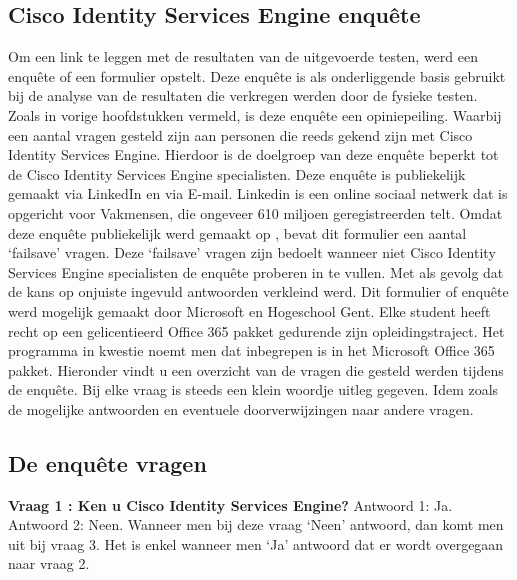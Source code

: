 \begin{itemize}
\section{Cisco Identity Services Engine enquête}
Om een link te leggen met de resultaten van de uitgevoerde testen, werd een enquête of een formulier opstelt. Deze enquête is als onderliggende basis gebruikt bij de analyse van de resultaten die verkregen werden door de fysieke testen. Zoals in vorige hoofdstukken vermeld, is deze enquête een opiniepeiling. Waarbij een aantal vragen gesteld zijn aan personen die reeds gekend zijn met Cisco Identity Services Engine. Hierdoor is de doelgroep van deze enquête beperkt tot de Cisco Identity Services Engine specialisten.
\newline
\newline
Deze enquête is publiekelijk gemaakt via LinkedIn en via E-mail. Linkedin is een online sociaal netwerk dat is opgericht voor Vakmensen, die ongeveer 610 miljoen geregistreerden telt. Omdat deze enquête publiekelijk werd gemaakt op \cite{LinkedIn}, bevat dit formulier een aantal ‘failsave’ vragen. Deze ‘failsave’ vragen zijn bedoelt wanneer niet Cisco Identity Services Engine specialisten de enquête proberen in te vullen. Met als gevolg dat de kans op onjuiste ingevuld antwoorden verkleind werd.
\newline
\newline
Dit formulier of enquête werd mogelijk gemaakt door Microsoft en Hogeschool Gent. Elke student heeft recht op een gelicentieerd Office 365 pakket gedurende zijn opleidingstraject. Het programma in kwestie noemt men \cite{MicrosoftForms} dat inbegrepen is in het Microsoft Office 365 pakket.
\newline
\newline
Hieronder vindt u een overzicht van de vragen die gesteld werden tijdens de enquête. Bij elke vraag is steeds een klein woordje uitleg gegeven. Idem zoals de mogelijke antwoorden en eventuele doorverwijzingen naar andere vragen.

\newpage
\subsection{De enquête vragen}
\textbf{Vraag 1 : Ken u Cisco Identity Services Engine?}
\newline
Antwoord 1: Ja. \newline
Antwoord 2: Neen. \newline \newline
Wanneer men bij deze vraag ‘Neen’ antwoord, dan komt men uit bij vraag 3. Het is enkel wanneer men ‘Ja’ antwoord dat er wordt overgegaan naar vraag 2.


\end{itemize}
